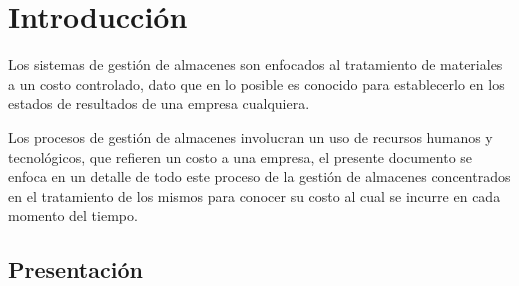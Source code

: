 

\chapter{Introducción}

Los sistemas de gestión de almacenes son enfocados al tratamiento de materiales a un costo controlado, dato que en lo posible es conocido para establecerlo en los estados de resultados de una empresa cualquiera.

Los procesos de gestión de almacenes involucran un uso de recursos humanos y tecnológicos, que refieren un costo a una empresa, el presente documento se enfoca en un detalle de todo este proceso de la gestión de almacenes concentrados en el tratamiento de los mismos para conocer su costo al cual se incurre en cada momento del tiempo. 


\section{Presentación} %

